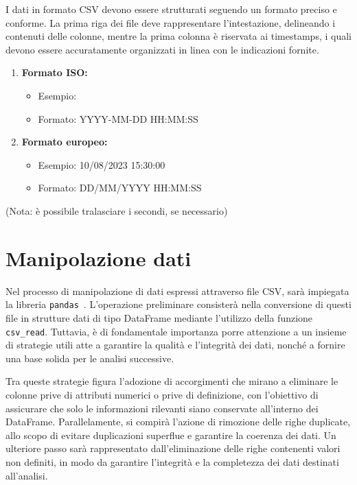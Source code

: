 \documentclass{rapportECL}
\begin{document}
I dati in formato CSV devono essere strutturati seguendo un formato preciso e conforme. 
La prima riga dei file deve rappresentare l'intestazione, delineando i contenuti delle colonne, mentre la prima colonna è riservata ai timestamps, 
i quali devono essere accuratamente organizzati in linea con le indicazioni fornite.
\begin{enumerate} 
  \item \textbf{Formato ISO:}
  \begin{itemize}
    \item Esempio:  
    \item Formato: YYYY-MM-DD HH:MM:SS
  \end{itemize}
  \item \textbf{Formato europeo:}
  \begin{itemize}
    \item Esempio: 10/08/2023 15:30:00
    \item Formato: DD/MM/YYYY HH:MM:SS
  \end{itemize} 
\end{enumerate}

(Nota: è possibile tralasciare i secondi, se necessario)

\section{Manipolazione dati}
Nel processo di manipolazione di dati espressi attraverso file CSV, sarà impiegata la libreria  \texttt{pandas}~\cite{pandas}. L'operazione preliminare 
consisterà nella conversione di questi file in strutture dati di tipo DataFrame mediante l'utilizzo della funzione  \texttt{csv\_read}. 
Tuttavia, è di fondamentale importanza porre attenzione a un insieme di strategie utili atte a garantire la qualità e l'integrità dei dati, 
nonché a fornire una base solida per le analisi successive.

Tra queste strategie figura l'adozione di accorgimenti che mirano a eliminare le colonne prive di attributi numerici o 
prive di definizione, con l'obiettivo di assicurare che solo le informazioni rilevanti siano conservate all'interno dei DataFrame. 
Parallelamente, si compirà l'azione di rimozione delle righe duplicate, allo scopo di evitare duplicazioni superflue e garantire la coerenza dei dati. 
Un ulteriore passo sarà rappresentato dall'eliminazione delle righe contenenti valori non definiti, in modo da garantire l'integrità e la completezza 
dei dati destinati all'analisi.
\end{document}
